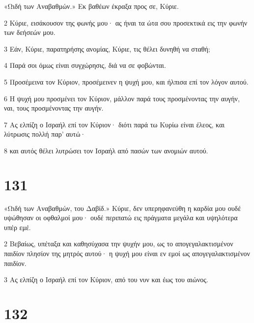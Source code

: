 \par «Ωιδή των Αναβαθμών.» Εκ βαθέων έκραξα προς σε, Κύριε.
\par 2 Κύριε, εισάκουσον της φωνής μου· ας ήναι τα ώτα σου προσεκτικά εις την φωνήν των δεήσεών μου.
\par 3 Εάν, Κύριε, παρατηρήσης ανομίας, Κύριε, τις θέλει δυνηθή να σταθή;
\par 4 Παρά σοι όμως είναι συγχώρησις, διά να σε φοβώνται.
\par 5 Προσέμεινα τον Κύριον, προσέμεινεν η ψυχή μου, και ήλπισα επί τον λόγον αυτού.
\par 6 Η ψυχή μου προσμένει τον Κύριον, μάλλον παρά τους προσμένοντας την αυγήν, ναι, τους προσμένοντας την αυγήν.
\par 7 Ας ελπίζη ο Ισραήλ επί τον Κύριον· διότι παρά τω Κυρίω είναι έλεος, και λύτρωσις πολλή παρ' αυτώ·
\par 8 και αυτός θέλει λυτρώσει τον Ισραήλ από πασών των ανομιών αυτού.

\chapter{131}

\par «Ωιδή των Αναβαθμών, του Δαβίδ.» Κύριε, δεν υπερηφανεύθη η καρδία μου ουδέ υψώθησαν οι οφθαλμοί μου· ουδέ περιπατώ εις πράγματα μεγάλα και υψηλότερα υπέρ εμέ.
\par 2 Βεβαίως, υπέταξα και καθησύχασα την ψυχήν μου, ως το απογεγαλακτισμένον παιδίον πλησίον της μητρός αυτού· η ψυχή μου είναι εν εμοί ως απογεγαλακτισμένον παιδίον.
\par 3 Ας ελπίζη ο Ισραήλ επί τον Κύριον, από του νυν και έως του αιώνος.

\chapter{132}

